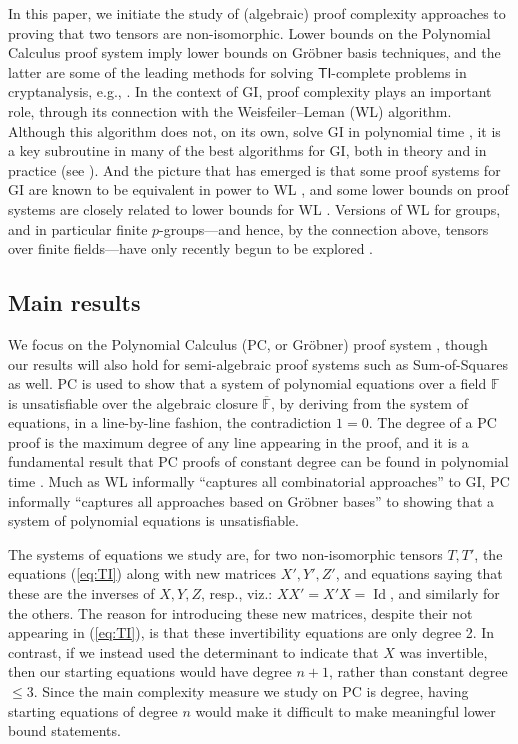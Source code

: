 \documentclass[10pt,a4paper]{article}
\theoremstyle{definition}
\DeclareMathOperator{\Id}{Id}
\newcommand{\F}{\mathbb{F}}
\begin{document}
In this paper, we initiate the study of (algebraic) proof complexity approaches to proving that two tensors are non-isomorphic.
Lower bounds on the Polynomial Calculus proof system imply lower bounds on Gr\"{o}bner basis techniques, and the latter are some of the leading methods for solving $\mathsf{TI}$-complete problems in cryptanalysis, e.g., \cite{DBLP:conf/eurocrypt/TangDJPQS22, DBLP:conf/eurocrypt/FaugereP06}.
In the context of \textsc{GI}, proof complexity plays an important role, through its connection with the Weisfeiler--Leman (WL) algorithm. Although this algorithm does not, on its own, solve \textsc{GI} in polynomial time \cite{CFI}, it is a key subroutine in many of the best algorithms for \textsc{GI}, both in theory \cite{Babai} and in practice (see \cite{mckay, MP}). And the picture that has emerged is that some proof systems for \textsc{GI} are known to be equivalent in power to WL \cite{AM, BerkholzG15}, and some lower bounds on proof systems are closely related to lower bounds for WL \cite{SSC, DBLP:conf/soda/ODonnellWWZ14, BerkholzG15}. Versions of WL for groups, and in particular finite $p$-groups---and hence, by the connection above, tensors over finite fields---have only recently begun to be explored \cite{BGLQW, BS1, BS2, CL}.

\subsection{Main results}

We focus on the Polynomial Calculus (PC, or Gr\"{o}bner) proof system \cite{CEI}, though our results will also hold for semi-algebraic proof systems such as Sum-of-Squares \cite{lasserre} as well. PC is used to show that a system of polynomial equations over a field $\F$ is unsatisfiable over the algebraic closure $\overline{\F}$, by deriving from the system of equations, in a line-by-line fashion, the contradiction $1=0$. The degree of a PC proof is the maximum degree of any line appearing in the proof, and it is a fundamental result that PC proofs of constant degree can be found in polynomial time \cite{CEI}. Much as WL informally ``captures all combinatorial approaches'' to \textsc{GI}, PC informally ``captures all approaches based on Gr\"{o}bner bases'' to showing that a system of polynomial equations is unsatisfiable. 

The systems of equations we study are, for two non-isomorphic tensors $T,T'$, the equations (\ref{eq:TI}) along with new matrices $X',Y',Z'$, and equations saying that these are the inverses of $X,Y,Z$, resp., viz.: $XX'=X'X = \Id$, and similarly for the others. The reason for introducing these new matrices, despite their not appearing in (\ref{eq:TI}), is that these invertibility equations are only degree 2. In contrast, if we instead used the determinant to indicate that $X$ was invertible, then our starting equations would have degree $n+1$, rather than constant degree $\leq 3$. Since the main complexity measure we study on PC is degree, having starting equations of degree $n$ would make it difficult to make meaningful lower bound statements.
\end{document}
